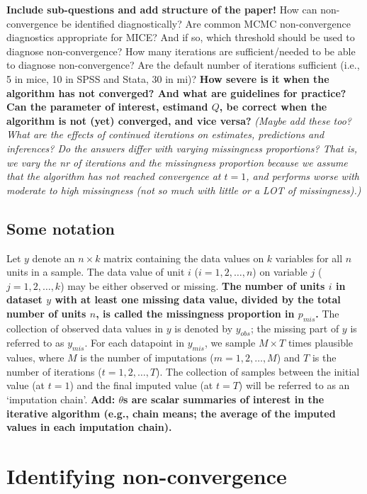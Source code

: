 \documentclass[Royal,times,sageh]{sagej}
\begin{document}
\textbf{Include sub-questions and add structure of the paper!} How can
non-convergence be identified diagnostically? Are common MCMC
non-convergence diagnostics appropriate for MICE? And if so, which
threshold should be used to diagnose non-convergence? How many
iterations are sufficient/needed to be able to diagnose non-convergence?
Are the default number of iterations sufficient (i.e., 5 in mice, 10 in
SPSS and Stata, 30 in mi)? \textbf{How severe is it when the algorithm
has not converged? And what are guidelines for practice? Can the
parameter of interest, estimand \(Q\), be correct when the algorithm is
not (yet) converged, and vice versa?} \emph{(Maybe add these too? What
are the effects of continued iterations on estimates, predictions and
inferences? Do the answers differ with varying missingness proportions?
That is, we vary the nr of iterations and the missingness proportion
because we assume that the algorithm has not reached convergence at
\(t=1\), and performs worse with moderate to high missingness (not so
much with little or a LOT of missingness).)}

\hypertarget{some-notation}{%
\subsection{Some notation}\label{some-notation}}

Let \(y\) denote an \(n \times k\) matrix containing the data values on
\(k\) variables for all \(n\) units in a sample. The data value of unit
\(i\) (\(i = 1, 2, \dots, n\)) on variable \(j\)
(\(j = 1, 2, \dots, k\)) may be either observed or missing. \textbf{The
number of units \(i\) in dataset \(y\) with at least one missing data
value, divided by the total number of units \(n\), is called the
missingness proportion in \(p_{mis}\).} The collection of observed data
values in \(y\) is denoted by \(y_{obs}\); the missing part of \(y\) is
referred to as \(y_{mis}\). For each datapoint in \(y_{mis}\), we sample
\(M \times T\) times plausible values, where \(M\) is the number of
imputations (\(m = 1, 2, \dots, M\)) and \(T\) is the number of
iterations (\(t = 1, 2, \dots, T\)). The collection of samples between
the initial value (at \(t=1\)) and the final imputed value (at \(t=T\))
will be referred to as an `imputation chain'. \textbf{Add: \(\theta\)s
are scalar summaries of interest in the iterative algorithm (e.g., chain
means; the average of the imputed values in each imputation chain). }

\hypertarget{identifying-non-convergence}{%
\section{Identifying
non-convergence}\label{identifying-non-convergence}}
\end{document}
